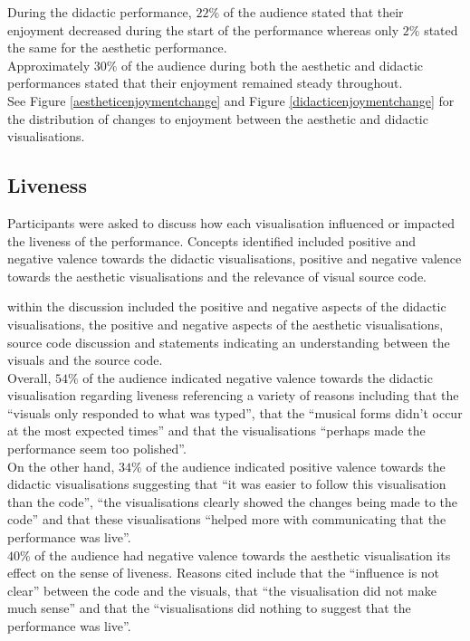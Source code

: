During the didactic performance, $22\%$ of the audience stated that their enjoyment decreased during the start of the performance whereas only $2\%$ stated the same for the aesthetic performance.\\

Approximately $30\%$ of the audience during both the aesthetic and didactic performances stated that their enjoyment remained steady throughout.\\

See Figure \ref{aestheticenjoymentchange} and Figure \ref{didacticenjoymentchange} for the distribution of changes to enjoyment between the aesthetic and didactic visualisations.\\

\subsection{Liveness}

Participants were asked to discuss how each visualisation influenced or impacted the liveness of the performance. Concepts identified included positive and negative valence towards the didactic visualisations, positive and negative valence towards the aesthetic visualisations and the relevance of visual source code. 

within the discussion included the positive and negative aspects of the didactic visualisations, the positive and negative aspects of the aesthetic visualisations, source code discussion and statements indicating an understanding between the visuals and the source code.\\

Overall, $54\%$ of the audience indicated negative valence towards the didactic visualisation regarding liveness referencing a variety of reasons including that the ``visuals only responded to what was typed'', that the ``musical forms didn't occur at the most expected times'' and that the visualisations ``perhaps made the performance seem too polished''.\\

On the other hand, $34\%$ of the audience indicated positive valence towards the didactic visualisations suggesting that ``it was easier to follow this visualisation than the code'', ``the visualisations clearly showed the changes being made to the code'' and that these visualisations ``helped more with communicating that the performance was live''.\\

$40\%$ of the audience had negative valence towards the aesthetic visualisation its effect on the sense of liveness. Reasons cited include that the ``influence is not clear'' between the code and the visuals, that ``the visualisation did not make much sense'' and that the ``visualisations did nothing to suggest that the performance was live''.\\

